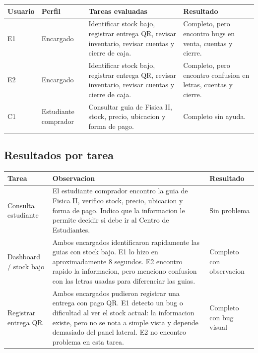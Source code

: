 \documentclass[12pt,letterpaper]{article}
\begin{document}
\begin{center}
\small
\begin{tabularx}{\textwidth}{|B{1.7cm}|B{2.8cm}|Y|B{2.6cm}|}
\hline
Usuario & Perfil & Tareas evaluadas & Resultado \\
\hline
E1 & Encargado & Identificar stock bajo, registrar entrega QR, revisar inventario, revisar cuentas y cierre de caja. & Completo, pero encontro bugs en venta, cuentas y cierre. \\
\hline
E2 & Encargado & Identificar stock bajo, registrar entrega QR, revisar inventario, revisar cuentas y cierre de caja. & Completo, pero encontro confusion en letras, cuentas y cierre. \\
\hline
C1 & Estudiante comprador & Consultar guia de Fisica II, stock, precio, ubicacion y forma de pago. & Completo sin ayuda. \\
\hline
\end{tabularx}
\end{center}

\subsection{Resultados por tarea}

\begin{center}
\small
\begin{tabularx}{\textwidth}{|B{3.3cm}|Y|B{2.4cm}|}
\hline
Tarea & Observacion & Resultado \\
\hline
Consulta estudiante & El estudiante comprador encontro la guia de Fisica II, verifico stock, precio, ubicacion y forma de pago. Indico que la informacion le permite decidir si debe ir al Centro de Estudiantes. & Sin problema \\
\hline
Dashboard / stock bajo & Ambos encargados identificaron rapidamente las guias con stock bajo. E1 lo hizo en aproximadamente 8 segundos. E2 encontro rapido la informacion, pero menciono confusion con las letras usadas para diferenciar las guias. & Completo con observacion \\
\hline
Registrar entrega QR & Ambos encargados pudieron registrar una entrega con pago QR. E1 detecto un bug o dificultad al ver el stock actual: la informacion existe, pero no se nota a simple vista y depende demasiado del panel lateral. E2 no encontro problema en esta tarea. & Completo con bug visual \\
\hline
\end{tabularx}
\end{center}
\end{document}
